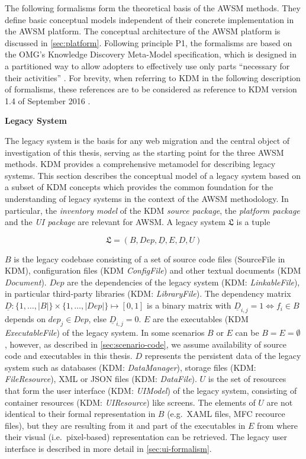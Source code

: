 The following formalisms form the theoretical basis of the AWSM methods.
They define basic conceptual models independent of their concrete implementation in the AWSM platform.
The conceptual architecture of the AWSM platform is discussed in \cref{sec:platform}.
Following principle P1, the formalisms are based on the OMG's Knowledge Discovery Meta-Model specification, which is designed in a partitioned way to allow adopters to effectively use only parts ``necessary for their activities'' \autocite{OMG2016KDM}.
For brevity, when referring to KDM in the following description of formalisms, these references are to be considered as reference to KDM version 1.4 of September 2016 \autocite{OMG2016KDM}.

\textbf{Legacy System}

The legacy system is the basis for any web migration and the central object of investigation of this thesis, serving as the starting point for the three AWSM methods.
KDM \autocite{OMG2016KDM} provides a comprehensive metamodel for describing legacy systems.
This section describes the conceptual model of a legacy system based on a subset of KDM concepts which provides the common foundation for the understanding of legacy systems in the context of the AWSM methodology.
In particular, the \emph{inventory model} of the KDM \emph{source package}, the \emph{platform package} and the \emph{UI package} are relevant for AWSM.
A legacy system \(\mathfrak{L}\) is a tuple

\begin{equation}\mathfrak{L} = (B, Dep, \underline D,  E, D, U)\label{eq:legacy-system}\end{equation}

\(B\) is the legacy codebase consisting of a set of source code files (SourceFile in KDM), configuration files (KDM \emph{ConfigFile}) and other textual documents (KDM \emph{Document}).
\(Dep\) are the dependencies of the legacy system (KDM: \emph{LinkableFile}), in particular third-party libraries (KDM: \emph{LibraryFile}).
The dependency matrix \(\underline D: \{1,\ldots, |B|\} \times \{1,\ldots, |Dep|\} \mapsto [0,1]\) is a binary matrix with \(\underline D_{i,j} = 1 \Longleftrightarrow f_i \in B\) depends on \(dep_j \in Dep\), else \(\underline D_{i,j} = 0\).
\(E\) are the executables (KDM \emph{ExecutableFile}) of the legacy system.
In some scenarios \(B\) or \(E\) can be \(B=E=\emptyset\) , however, as described in \cref{sec:scenario-code}, we assume availability of source code and executables in this thesis.
\(D\) represents the persistent data of the legacy system such as databases (KDM: \emph{DataManager}), storage files (KDM: \emph{FileResource}), XML or JSON files (KDM: \emph{DataFile}).
\(U\) is the set of resources that form the user interface (KDM: \emph{UIModel}) of the legacy system, consisting of container resources (KDM: \emph{UIResource}) like screens.
The elements of \(U\) are not identical to their formal representation in \(B\) (e.g.~XAML files, MFC recource files), but they are resulting from it and part of the executables in \(E\) from where their visual (i.e.~pixel-based) representation can be retrieved.
The legacy user interface is described in more detail in \cref{sec:ui-formalism}.

